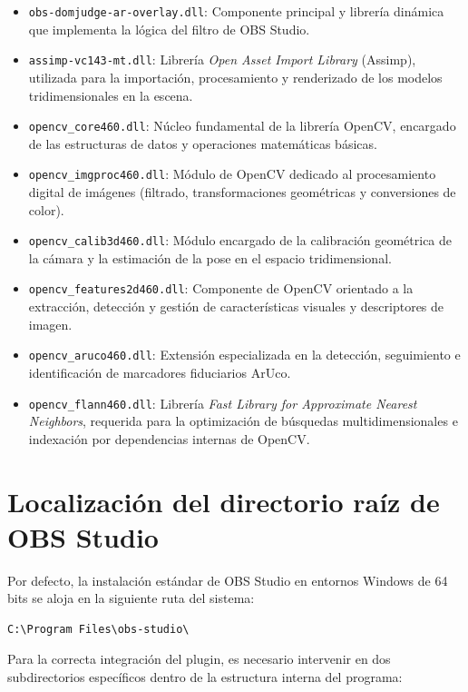 \begin{itemize}
    \item \texttt{obs-domjudge-ar-overlay.dll}: Componente principal y librería dinámica que implementa la lógica del filtro de OBS Studio.
    \item \texttt{assimp-vc143-mt.dll}: Librería \textit{Open Asset Import Library} (Assimp), utilizada para la importación, procesamiento y renderizado de los modelos tridimensionales en la escena.
    \item \texttt{opencv\_core460.dll}: Núcleo fundamental de la librería OpenCV, encargado de las estructuras de datos y operaciones matemáticas básicas.
    \item \texttt{opencv\_imgproc460.dll}: Módulo de OpenCV dedicado al procesamiento digital de imágenes (filtrado, transformaciones geométricas y conversiones de color).
    \item \texttt{opencv\_calib3d460.dll}: Módulo encargado de la calibración geométrica de la cámara y la estimación de la pose en el espacio tridimensional.
    \item \texttt{opencv\_features2d460.dll}: Componente de OpenCV orientado a la extracción, detección y gestión de características visuales y descriptores de imagen.
    \item \texttt{opencv\_aruco460.dll}: Extensión especializada en la detección, seguimiento e identificación de marcadores fiduciarios ArUco.
    \item \texttt{opencv\_flann460.dll}: Librería \textit{Fast Library for Approximate Nearest Neighbors}, requerida para la optimización de búsquedas multidimensionales e indexación por dependencias internas de OpenCV.
\end{itemize}

\section{Localización del directorio raíz de OBS Studio}

Por defecto, la instalación estándar de OBS Studio en entornos Windows de 64 bits se aloja en la siguiente ruta del sistema:

\begin{verbatim}
C:\Program Files\obs-studio\
\end{verbatim}

Para la correcta integración del plugin, es necesario intervenir en dos subdirectorios específicos dentro de la estructura interna del programa:

